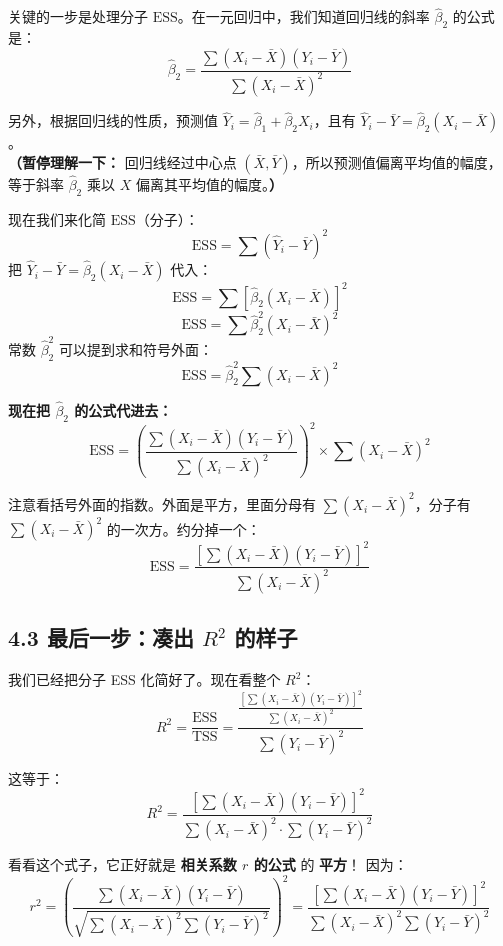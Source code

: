 \documentclass[12pt,a4paper]{article}
\begin{document}
关键的一步是处理分子 \(\mathrm{ESS}\)。在一元回归中，我们知道回归线的斜率 \(\hat{\beta}_2\) 的公式是：
\begin{equation}
    \hat{\beta}_2 = \frac{\sum (X_i - \bar{X})(Y_i - \bar{Y})}{\sum (X_i - \bar{X})^2}
\end{equation}

另外，根据回归线的性质，预测值 \(\hat{Y}_i = \hat{\beta}_1 + \hat{\beta}_2 X_i\)，且有 \(\hat{Y}_i - \bar{Y} = \hat{\beta}_2 (X_i - \bar{X})\)。\\
\textbf{（暂停理解一下：} 回归线经过中心点 \((\bar{X}, \bar{Y})\)，所以预测值偏离平均值的幅度，等于斜率 \(\hat{\beta}_2\) 乘以 \(X\) 偏离其平均值的幅度。\textbf{）}

现在我们来化简 \(\mathrm{ESS}\)（分子）：
\[
\mathrm{ESS} = \sum (\hat{Y}_i - \bar{Y})^2
\]
把 \(\hat{Y}_i - \bar{Y} = \hat{\beta}_2 (X_i - \bar{X})\) 代入：
\[
\mathrm{ESS} = \sum [\hat{\beta}_2 (X_i - \bar{X})]^2
\]
\[
\mathrm{ESS} = \sum \hat{\beta}_2^2 (X_i - \bar{X})^2
\]
常数 \(\hat{\beta}_2^2\) 可以提到求和符号外面：
\[
\mathrm{ESS} = \hat{\beta}_2^2 \sum (X_i - \bar{X})^2
\]

\textbf{现在把 \(\hat{\beta}_2\) 的公式代进去：}
\[
\mathrm{ESS} = \left( \frac{\sum (X_i - \bar{X})(Y_i - \bar{Y})}{\sum (X_i - \bar{X})^2} \right)^2 \times \sum (X_i - \bar{X})^2
\]

注意看括号外面的指数。外面是平方，里面分母有 \(\sum (X_i - \bar{X})^2\)，分子有 \(\sum (X_i - \bar{X})^2\) 的一次方。约分掉一个：
\begin{equation}
    \mathrm{ESS} = \frac{[\sum (X_i - \bar{X})(Y_i - \bar{Y})]^2}{\sum (X_i - \bar{X})^2}
\end{equation}

\subsection*{4.3 最后一步：凑出 \(R^2\) 的样子}

我们已经把分子 ESS 化简好了。现在看整个 \(R^2\)：
\[
R^2 = \frac{\mathrm{ESS}}{\mathrm{TSS}} = \frac{\frac{[\sum (X_i - \bar{X})(Y_i - \bar{Y})]^2}{\sum (X_i - \bar{X})^2}}{\sum (Y_i - \bar{Y})^2}
\]

这等于：
\begin{equation}
    R^2 = \frac{[\sum (X_i - \bar{X})(Y_i - \bar{Y})]^2}{\sum (X_i - \bar{X})^2 \cdot \sum (Y_i - \bar{Y})^2}
\end{equation}

看看这个式子，它正好就是 \textbf{相关系数 \(r\) 的公式} 的 \textbf{平方}！
因为：
\begin{equation}
    r^2 = \left( \frac{\sum (X_i - \bar{X})(Y_i - \bar{Y})}{\sqrt{\sum (X_i - \bar{X})^2 \sum (Y_i - \bar{Y})^2}} \right)^2 = \frac{[\sum (X_i - \bar{X})(Y_i - \bar{Y})]^2}{\sum (X_i - \bar{X})^2 \sum (Y_i - \bar{Y})^2}
\end{equation}
\end{document}
